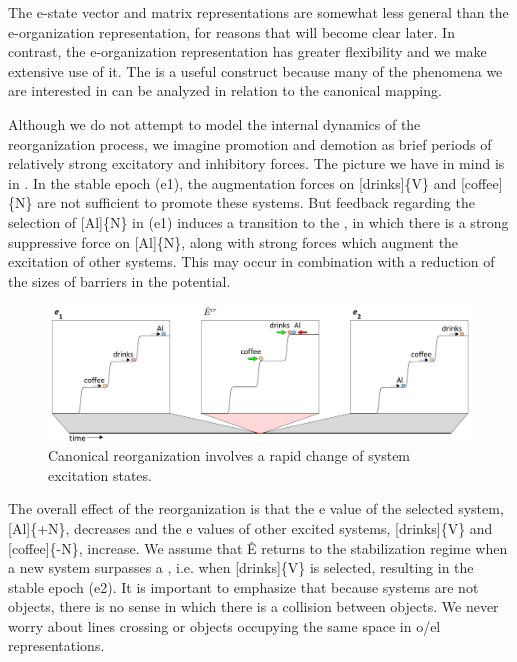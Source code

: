   The e-state vector and matrix representations are somewhat less general than the e-organization representation, for reasons that will become clear later. In contrast, the e-organization representation has greater flexibility and we make extensive use of it. The  is a useful construct because many of the phenomena we are interested in can be analyzed in relation to the canonical mapping.

  Although we do not attempt to model the internal dynamics of the reorganization process, we imagine promotion and demotion as brief periods of relatively strong excitatory and inhibitory forces. The picture we have in mind is in {}. In the stable epoch (e1), the augmentation forces on [drinks]\{V\} and [coffee]\{N\} are not sufficient to promote these systems. But feedback regarding the selection of [Al]\{N\} in (e1) induces a transition to the , in which there is a strong suppressive force on [Al]\{N\}, along with strong forces which augment the excitation of other systems. This may occur in combination with a reduction of the sizes of barriers in the potential. 

  
\begin{figure}
\includegraphics[width=\textwidth]{figures/Tilsen-img26.png}
\caption{Canonical reorganization involves a rapid change of system excitation states.}
\label{fig:2:19}
\end{figure}
 

  The overall effect of the reorganization is that the e value of the selected system, [Al]\{+N\}, decreases and the e values of other excited systems, [drinks]\{V\} and [coffee]\{-N\}, increase. We assume that Ê returns to the stabilization regime when a new system surpasses a , i.e. when [drinks]\{V\} is selected, resulting in the stable epoch (e2). It is important to emphasize that because systems are not objects, there is no sense in which there is a collision between objects. We never worry about lines crossing or objects occupying the same space in o/el representations.

